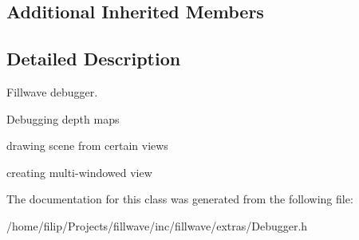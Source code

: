 \subsection*{Additional Inherited Members}


\subsection{Detailed Description}
Fillwave debugger. 


\begin{DoxyItemize}
\item Debugging depth maps
\item drawing scene from certain views
\item creating multi-\/windowed view 
\end{DoxyItemize}

The documentation for this class was generated from the following file\+:\begin{DoxyCompactItemize}
\item 
/home/filip/\+Projects/fillwave/inc/fillwave/extras/Debugger.\+h\end{DoxyCompactItemize}
